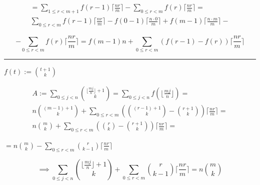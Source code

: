 \documentclass{article}
\begin{document}
\begin{multline*}
= \sum_{1 \leq r < m+1} f(r-1) \lceil{\frac{nr}{m}}\rceil - \sum_{0 \leq r < m} f(r) \lceil{\frac{nr}{m}}\rceil = \\
\sum_{0 \leq r < m} f(r-1) \lceil{\frac{nr}{m}}\rceil - f(0-1)\lceil{\frac{n \cdot 0}{m}}\rceil + f(m-1)\lceil{\frac{n \cdot m}{m}}\rceil -
\end{multline*}

\[ - \sum_{0 \leq r < m} f(r) \lceil{\frac{nr}{m}}\rceil = f(m-1)n + \sum_{0 \leq r < m} (f(r-1)-f(r)) \lceil{\frac{nr}{m}}\rceil \]

\bigskip\hrule\bigskip

\( f(t) := \binom{t + 1}{k} \)

\begin{multline*}
A := \sum_{0 \leq j < n} \binom{\lfloor\frac{mj}{n}\rfloor + 1}{k} = \sum_{0 \leq j < n} f(\lfloor{\frac{mj}{n}}\rfloor) = \\
n \binom{(m-1)+1}{k} + \sum_{0 \leq r < m} (\binom{(r-1)+1}{k}-\binom{r+1}{k}) \lceil{\frac{nr}{m}}\rceil = \\
n \binom{m}{k} + \sum_{0 \leq r < m} (\binom{r}{k}-\binom{r+1}{k}) \lceil{\frac{nr}{m}}\rceil =
\end{multline*}

\( = n \binom{m}{k} - \sum_{0 \leq r < m} \binom{r}{k-1}\lceil{\frac{nr}{m}}\rceil \)

\[ \implies \sum_{0 \leq j < n} \binom{\lfloor\frac{mj}{n}\rfloor + 1}{k} + \sum_{0 \leq r < m} \binom{r}{k-1}\lceil{\frac{nr}{m}}\rceil = n \binom{m}{k} \]
\end{document}
